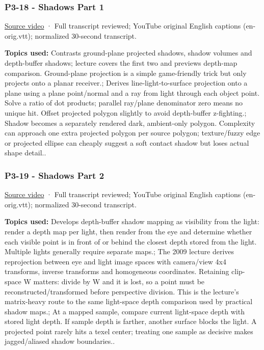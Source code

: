 \subsubsection{P3-18 - Shadows Part 1}\label{04-visual-computing-ii-ch036-p3-18---shadows-part-1}

\hypertarget{04-visual-computing-ii-ch036-p3-18---shadows-part-1}{}

\href{https://www.youtube.com/watch?v=kmdRmXuOjIY}{Source video} · Full transcript reviewed; YouTube original English captions (en-orig.vtt); normalized 30-second transcript.

\textbf{Topics used:} Contrasts ground-plane projected shadows, shadow volumes and depth-buffer shadows; lecture covers the first two and previews depth-map comparison. Ground-plane projection is a simple game-friendly trick but only projects onto a planar receiver.; Derives line-light-to-surface projection onto a plane using a plane point/normal and a ray from light through each object point. Solve a ratio of dot products; parallel ray/plane denominator zero means no unique hit. Offset projected polygon slightly to avoid depth-buffer z-fighting.; Shadow becomes a separately rendered dark, ambient-only polygon. Complexity can approach one extra projected polygon per source polygon; texture/fuzzy edge or projected ellipse can cheaply suggest a soft contact shadow but loses actual shape detail..

\subsubsection{P3-19 - Shadows Part 2}\label{04-visual-computing-ii-ch036-p3-19---shadows-part-2}

\hypertarget{04-visual-computing-ii-ch036-p3-19---shadows-part-2}{}

\href{https://www.youtube.com/watch?v=qiJhB0fOY6I}{Source video} · Full transcript reviewed; YouTube original English captions (en-orig.vtt); normalized 30-second transcript.

\textbf{Topics used:} Develops depth-buffer shadow mapping as visibility from the light: render a depth map per light, then render from the eye and determine whether each visible point is in front of or behind the closest depth stored from the light. Multiple lights generally require separate maps.; The 2009 lecture derives reprojection between eye and light image spaces with camera/view 4x4 transforms, inverse transforms and homogeneous coordinates. Retaining clip-space W matters: divide by W and it is lost, so a point must be reconstructed/transformed before perspective division. This is the lecture's matrix-heavy route to the same light-space depth comparison used by practical shadow maps.; At a mapped sample, compare current light-space depth with stored light depth. If sample depth is farther, another surface blocks the light. A projected point rarely hits a texel center; treating one sample as decisive makes jagged/aliased shadow boundaries..

